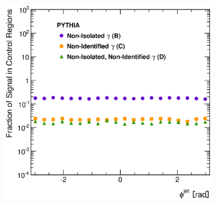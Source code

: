 \documentclass[12pt, twoside]{article}
\numberwithin{equation}{section}
\numberwithin{figure}{section}
\newenvironment{changemargin}[2]{%
\begin{list}{}{%
\setlength{\topsep}{0pt}%
\setlength{\leftmargin}{#1}%
\setlength{\rightmargin}{#2}%
\setlength{\listparindent}{\parindent}%
\setlength{\itemindent}{\parindent}%
\setlength{\parsep}{\parskip}%
}%
\item[]}{\end{list}}
\begin{document}
\begin{figure}
\begin{changemargin}{-1.0cm}{-0.75cm}
\begin{changemargin}{-0.75cm}{-1.0cm}
\begin{subfigure}[b]{0.37\textwidth}
            \subcaption{}
            \label{fig:SLFRapidityJet}
        \end{subfigure}
        \begin{subfigure}[b]{0.37\textwidth}
            \includegraphics[width=\textwidth]{./images/SignalLeakageFractionsPythia/SLF-106.eps}
            \subcaption{}
            \label{fig:SLFPhiJet}
        \end{subfigure}


\end{changemargin}
\end{changemargin}
\end{figure}
\end{document}
